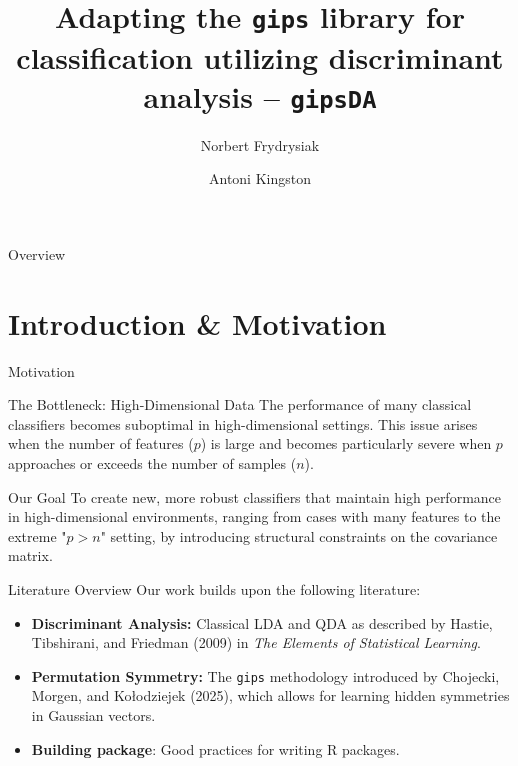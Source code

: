 \documentclass[aspectratio=169,xcolor=dvipsnames]{beamer}
\title{Adapting the \texttt{gips} library for classification utilizing discriminant analysis – \texttt{gipsDA}}
\author{Norbert Frydrysiak \and Antoni Kingston}
\institute
{
    Faculty of Mathematics and Information Sciences \\
    Warsaw University of Technology \\
    \vspace{0.2cm}
    \textit{Supervisors:} \\
    MSc Eng. Adam Chojecki \\
    PhD Bartosz Kołodziejek, Assoc. Prof.
}
\begin{document}
\begin{frame}
    \titlepage
\end{frame}

\begin{frame}{Overview}
    \tableofcontents
\end{frame}

\section{Introduction \& Motivation}
\begin{frame}{Motivation}

    \begin{alertblock}{The Bottleneck: High-Dimensional Data}
    The performance of many classical classifiers becomes suboptimal in high-dimensional settings. This issue arises when the number of features ($p$) is large and becomes particularly severe when $p$ approaches or exceeds the number of samples ($n$).
    \end{alertblock}

    \begin{block}{Our Goal}
    To create new, more robust classifiers that maintain high performance in high-dimensional environments, ranging from cases with many features to the extreme "$p > n$" setting, by introducing structural constraints on the covariance matrix.
    \end{block}
    
\end{frame}

\begin{frame}{Literature Overview}
    Our work builds upon the following literature:
    \begin{itemize}
        \item \textbf{Discriminant Analysis:} Classical LDA and QDA as described by Hastie, Tibshirani, and Friedman (2009) in \textit{The Elements of Statistical Learning}. \cite{elemstats}
        \item \textbf{Permutation Symmetry:} The \texttt{gips} methodology introduced by Chojecki, Morgen, and Kołodziejek (2025), which allows for learning hidden symmetries in Gaussian vectors. \cite{JSSv112i07}
        \item \textbf{Building package}: Good practices for writing R packages.
        \cite{wickham-bryan-r-packages-2e}
    \end{itemize}
\end{frame}
\end{document}
